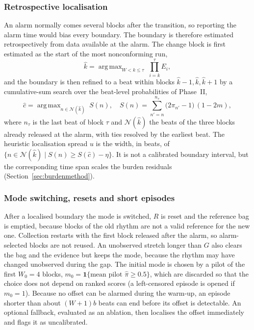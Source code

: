 \documentclass[preprint,12pt]{elsarticle}
\newcommand{\1}{\mathbf{1}}
\DeclareMathOperator*{\argmax}{arg\,max}
\begin{document}
\subsubsection{Retrospective localisation}
\label{sec:localisation}
An alarm normally comes several blocks after the transition, so reporting the alarm time would bias every boundary. The boundary is therefore estimated retrospectively from data available at the alarm. The change block is first estimated as the start of the most nonconforming run,
\begin{equation}
\hat k=\argmax_{W<k\le\tau}\;\prod_{i=k}^{\tau}E_i,
\label{eq:blockloc}
\end{equation}
and the boundary is then refined to a beat within blocks $\hat k-1,\hat k,\hat k+1$ by a cumulative-sum search over the beat-level probabilities of Phase~II,
\begin{equation}
\hat c=\argmax_{n\in\mathcal{N}(\hat k)}\;S(n),\quad S(n)=\sum_{n'=n}^{n_\tau}\bigl(2\pi_{n'}-1\bigr)\,(1-2m),
\label{eq:beatloc}
\end{equation}
where $n_\tau$ is the last beat of block $\tau$ and $\mathcal{N}(\hat k)$ the beats of the three blocks already released at the alarm, with ties resolved by the earliest beat. The heuristic localisation spread $u$ is the width, in beats, of $\{n\in\mathcal{N}(\hat k)\mid S(n)\ge S(\hat c)-\eta\}$. It is not a calibrated boundary interval, but the corresponding time span scales the burden residuals (Section~\ref{sec:burdenmethod}).

\subsubsection{Mode switching, resets and short episodes}
After a localised boundary the mode is switched, $R$ is reset and the reference bag is emptied, because blocks of the old rhythm are not a valid reference for the new one. Collection restarts with the first block released after the alarm, so alarm-selected blocks are not reused. An unobserved stretch longer than $G$ also clears the bag and the evidence but keeps the mode, because the rhythm may have changed unobserved during the gap. The initial mode is chosen by a pilot of the first $W_0=4$ blocks, $m_0=\1\{\text{mean pilot }\hat\pi\ge0.5\}$, which are discarded so that the choice does not depend on ranked scores (a left-censored episode is opened if $m_0=1$). Because no offset can be alarmed during the warm-up, an episode shorter than about $(W+1)b$ beats can end before its offset is detectable. An optional fallback, evaluated as an ablation, then localises the offset immediately and flags it as uncalibrated.
\end{document}
